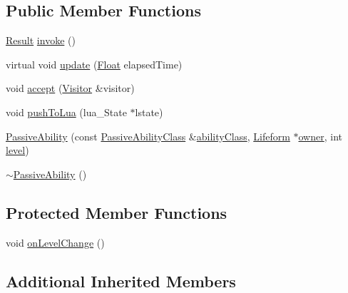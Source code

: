 \subsection*{Public Member Functions}
\begin{DoxyCompactItemize}
\item 
\hyperlink{classZeta_1_1Ability_acbc80e4d82c9683d190ed8ca1c80f597}{Result} \hyperlink{classZeta_1_1PassiveAbility_a614c5620ca721be42857860d6b08b297}{invoke} ()
\item 
virtual void \hyperlink{classZeta_1_1PassiveAbility_a45d40753e324bfc4752304607b8e8427}{update} (\hyperlink{namespaceZeta_a1e0a1265f9b3bd3075fb0fabd39088ba}{Float} elapsed\+Time)
\item 
void \hyperlink{classZeta_1_1PassiveAbility_a9bc4ddcb3bdfef6f55ff478c3fbe4dd2}{accept} (\hyperlink{classZeta_1_1Visitor}{Visitor} \&visitor)
\item 
void \hyperlink{classZeta_1_1PassiveAbility_af182d11a5f157d108a39f0e323ed7ea4}{push\+To\+Lua} (lua\+\_\+\+State $\ast$lstate)
\item 
\hyperlink{classZeta_1_1PassiveAbility_aed871699023859d3a5327d7c531a0435}{Passive\+Ability} (const \hyperlink{classZeta_1_1PassiveAbilityClass}{Passive\+Ability\+Class} \&\hyperlink{classZeta_1_1ClassifiedAbility_abd6f78106602f84787cac967c2308abe}{ability\+Class}, \hyperlink{classZeta_1_1Lifeform}{Lifeform} $\ast$\hyperlink{classZeta_1_1Ability_ad37bed67f04178297d6fe4c9a2ed619a}{owner}, int \hyperlink{classZeta_1_1Ability_a41d29a6fb79dd19a7eed5f6a4be5de9a}{level})
\item 
\hyperlink{classZeta_1_1PassiveAbility_aa2664407054a65ea243f595e3158344c}{$\sim$\+Passive\+Ability} ()
\end{DoxyCompactItemize}
\subsection*{Protected Member Functions}
\begin{DoxyCompactItemize}
\item 
void \hyperlink{classZeta_1_1PassiveAbility_aef651b48cfdd153aca93192cdc5f7ccd}{on\+Level\+Change} ()
\end{DoxyCompactItemize}
\subsection*{Additional Inherited Members}


